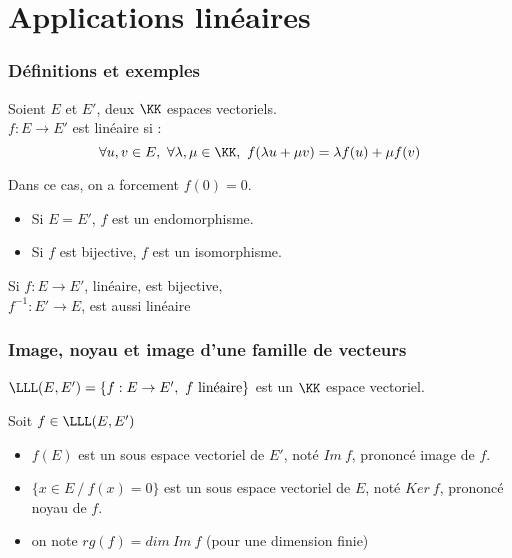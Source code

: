 \documentclass[../main.tex]{subfile}
\begin{document}
\part{Applications linéaires}
\section{Définitions et exemples}
\begin{defi}
	Soient $E$ et $E'$, deux $\KK$ espaces vectoriels.\\
	$f: E \to E'$ est linéaire si :
	$$\forall u, v \in E, \ \forall \lambda, \mu \in \KK, \ f(\lambda u + \mu v) = \lambda f(u) + \mu f(v)$$
\end{defi}

\begin{rema}
	Dans ce cas, on a forcement $f(0) = 0$.
\end{rema}

\begin{vocab}
\begin{itemize}	
	\item Si $E = E'$, $f$ est un endomorphisme.
	\item Si $f$ est bijective, $f$ est un isomorphisme.
\end{itemize}
\end{vocab}

\begin{rema}
	Si $f : E \to E'$, linéaire, est bijective, \\
	$f^{-1} : E' \to E$, est aussi linéaire
\end{rema}

\begin{ex}
\end{ex}

\section{Image, noyau et image d'une famille de vecteurs}
\begin{nota}
	$\LLL(E, E') = \{f: E \to E', \ f \text{ linéaire}\}$ est un $\KK$ espace vectoriel.
\end{nota}

\begin{defi}
	Soit $f \in \LLL(E, E')$\\
\begin{itemize}	
	\item $f(E)$ est un sous espace vectoriel de $E'$, noté $Im \ f$, prononcé image de $f$.
	\item $\{x \in E \ / \ f(x) = 0\}$ est un sous espace vectoriel de $E$, noté $Ker \ f$, prononcé noyau de $f$.
	\item on note $rg(f) = dim \ Im \ f$ (pour une dimension finie)
\end{itemize}
\end{defi}
\end{document}
